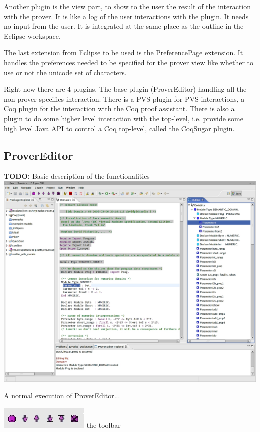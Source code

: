 \documentclass{entcs}
\newcommand{\todo}{\textbf{TODO: }}
\begin{document}
Another plugin is the view part, to show to the user the result of the
interaction with the prover. It is like a log of the user interactions
with the plugin. It needs no input from the user. It is integrated
at the same place as the outline in the Eclipse workspace.

The last extension from Eclipse to be used is the PreferencePage extension.
It handles the preferences needed to be specified for the prover view
like whether to use or not the unicode set of characters.


Right now there are 4 plugins. The base plugin (ProverEditor)
handling all the non-prover specifics interaction. There is a PVS plugin for
PVS interactions, a Coq plugin for the interaction with the Coq proof 
assistant. There is also a plugin to do some higher level interaction 
with the top-level, i.e. provide some high level Java API to control 
a Coq top-level, called the CoqSugar plugin. 
\subsection{ProverEditor}
\todo{Basic description of the functionalities}\\
\includegraphics[width=\linewidth]{screenshot1}

A normal execution of ProverEditor...

\includegraphics[width=0.3\linewidth]{toolbar}
the toolbar
\end{document}
